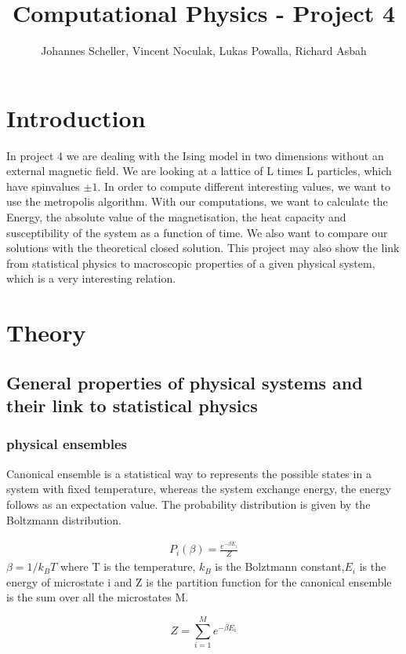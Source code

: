 \documentclass[10pt,a4paper]{article}
\author{Johannes Scheller, Vincent Noculak, Lukas Powalla, Richard Asbah}
\title{Computational Physics - Project 4}
\begin{document}
\maketitle
\newpage
\tableofcontents
\newpage

\section*{Introduction}
In project 4 we are dealing with the Ising model in two dimensions without an external magnetic field. We are looking at a lattice of L times L particles, which have spinvalues $\pm 1$. In order to compute different interesting values, we want to use the metropolis algorithm.  With our computations, we want to calculate the Energy, the absolute value of the magnetisation, the heat capacity and susceptibility of the system as a function of time. We also want to compare our solutions with the theoretical closed solution. 
This project may also show the link from statistical physics to macroscopic properties of a given physical system, which is a very interesting relation. 
\section{Theory}

\subsection{General properties of physical systems and their link to statistical physics}

\subsubsection{physical ensembles}
Canonical ensemble is a statistical way to represents the possible states in a system with fixed temperature, whereas the system exchange energy, the energy follows as an expectation value. The probability distribution is given by the Boltzmann distribution.

\begin{align}
P_i (\beta) =\frac{ e^{- \beta E_i}}{Z}
\end{align} 
$\beta = 1/k_B T$ where T is the temperature, $k_B$ is the Bolztmann constant,$E_i$ is the energy of microstate i and Z is the partition function for the canonical ensemble is the sum over all the microstates M.

\begin{equation}
  Z=\sum_{i=1}^{M}e^{- \beta E_i}
\end{equation}
   
\end{document}
